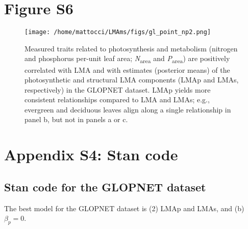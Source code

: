 \documentclass[
  12pt,
  letterpaper,
  DIV=11,
  numbers=noendperiod]{scrartcl}
\begin{document}
\newpage

\hypertarget{figure-s6}{%
\section{Figure S6}\label{figure-s6}}

\begin{figure}

{\centering \texttt{[image: /home/mattocci/LMAms/figs/gl\_point\_np2.png]}

}

\caption{\label{fig-gl_point_np2}Measured traits related to
photosynthesis and metabolism (nitrogen and phosphorus per-unit leaf
area; \emph{N}\textsubscript{area} and \emph{P}\textsubscript{area}) are
positively correlated with LMA and with estimates (posterior means) of
the photosynthetic and structural LMA components (LMAp and LMAs,
respectively) in the GLOPNET dataset. LMAp yields more consistent
relationships compared to LMA and LMAs; e.g., evergreen and deciduous
leaves align along a single relationship in panel b, but not in panels a
or c.}

\end{figure}

\hypertarget{appendix-s4-stan-code}{%
\section{Appendix S4: Stan code}\label{appendix-s4-stan-code}}

\hypertarget{stan-code-for-the-glopnet-dataset}{%
\subsection{Stan code for the GLOPNET
dataset}\label{stan-code-for-the-glopnet-dataset}}

The best model for the GLOPNET dataset is (2) LMAp and LMAs, and (b)
\(\beta_p = 0\).
\end{document}
